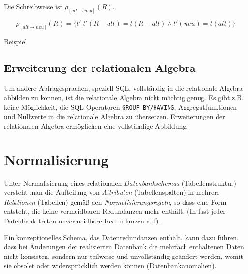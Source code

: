 \documentclass{scrbook}
\begin{document}
Die Schreibweise ist $ρ_[alt → neu](R)$.

\begin{definition}
\begin{displaymath}
ρ_[alt → neu](R) = \{ t' | t'(R - alt) = t(R-alt) ∧ t'(neu)=t(alt) \}
\end{displaymath}
\end{definition}

Beispiel

% 






\section{Erweiterung der relationalen Algebra}

Um andere Abfragesprachen, speziell SQL, vollständig in die relationale Algebra
abbilden zu können, ist die relationale Algebra nicht mächtig genug.
Es gibt z.B. keine Möglichkeit, die SQL-Operatoren 
\lstinline{GROUP-BY/HAVING}, Aggregatfunktionen und Nullwerte in die relationale
Algebra zu übersetzen.
Erweiterungen der relationalen Algebra ermöglichen eine vollständige Abbildung.






\chapter{Normalisierung}

Unter Normalisierung eines relationalen \emph{Datenbankschemas} (Tabellenstruktur)
versteht man die Aufteilung von \emph{Attributen} (Tabellenspalten)
in mehrere \emph{Relationen} (Tabellen) gemäß den \emph{Normalisierungsregeln},
so dass eine Form entsteht, die keine vermeidbaren Redundanzen mehr enthält.
(In fast jeder Datenbank treten unvermeidbare Redundanzen auf).

Ein konzeptionelles Schema, das Datenredundanzen enthält, kann dazu führen,
dass bei Änderungen der realisierten Datenbank die mehrfach enthaltenen Daten nicht
konsisten, sondern nur teilweise und unvollständig geändert werden,
womit sie obsolet oder widersprücklich werden können (Datenbankanomalien).
\end{document}
